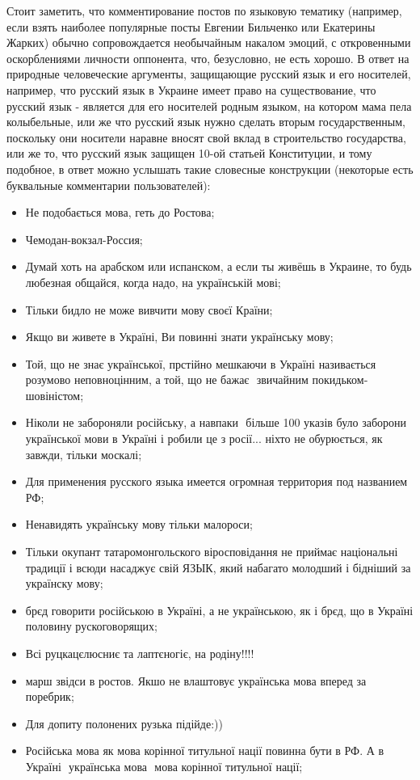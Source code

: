 Стоит заметить, что комментирование постов по языковую тематику (например, если
взять наиболее популярные посты Евгении Бильченко или Екатерины Жарких) обычно
сопровождается необычайным накалом эмоций, с откровенными оскорблениями
личности оппонента, что, безусловно, не есть хорошо. В ответ на природные
человеческие аргументы, защищающие русский язык и его носителей, например, что
русский язык в Украине имеет право на существование, что русский язык -
является для его носителей родным языком, на котором мама пела колыбельные, или
же что русский язык нужно сделать вторым государственным, поскольку они
носители наравне вносят свой вклад в строительство государства, или же то, что
русский язык защищен 10-ой статьей Конституции, и тому подобное, в ответ можно
услышать такие словесные конструкции (некоторые есть буквальные комментарии
пользователей):

\begin{itemize} %
\item Не подобається мова, геть до Ростова; 
\item Чемодан-вокзал-Россия;
\item Думай хоть на арабском или испанском, а если ты живёшь в Украине, то будь
любезная общайся, когда надо, на українській мові;
\item Тільки бидло не може вивчити мову своєї Країни;
\item Якщо ви живете в Україні, Ви повинні знати українську мову;
\item Той, що не знає української, прстійно мешкаючи в Україні називається розумово неповноцінним, а той, що не бажає ­ звичайним покидьком­шовіністом;
\item Ніколи не забороняли російську, а навпаки ­ більше 100 указів було заборони української мови в Україні і робили це з росії... ніхто не обурюється, як завжди, тільки москалі;
\item Для применения русского языка имеется огромная территория под названием РФ;
\item Ненавидять українську мову тільки малороси;
\item Тільки окупант татаромонгольского віросповідання не приймає національні традиції і всюди насаджує свій ЯЗЫК, який набагато молодший і бідніший за українску мову;
\item брєд говорити російською в Україні, а не українською, як і брєд, що в Україні половину рускоговорящих;
\item Всі руцкацєлюсниє та лаптєногіє, на родіну!!!!
\item марш звідси в ростов. Якшо не влаштовує українська мова вперед за поребрик;
\item Для допиту полонених рузька підійде:))
\item Російська мова як мова корінної титульної нації повинна бути в РФ. А в Україні ­ українська мова ­ мова корінної титульної нації;
\end{itemize} %
